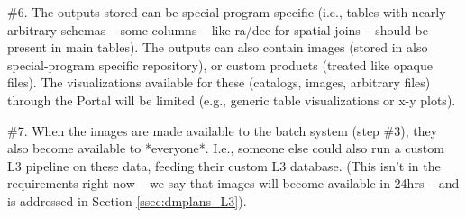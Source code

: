 \documentclass[DM,lsstdraft,toc]{lsstdoc}
\begin{document}
\#6. The outputs stored can be special-program specific (i.e., tables with nearly arbitrary schemas -- some columns -- like ra/dec for spatial joins -- should be present in main tables). The outputs can also contain images (stored in also special-program specific repository), or custom products (treated like opaque files). The visualizations available for these (catalogs, images, arbitrary files) through the Portal will be limited (e.g., generic table visualizations or x-y plots).

\#7. When the images are made available to the batch system (step \#3), they also become available to *everyone*. I.e., someone else could also run a custom L3 pipeline on these data, feeding their custom L3 database. (This isn't in the requirements right now -- we say that images will become available in 24hrs -- and is addressed in Section \ref{ssec:dmplans_L3}).

\clearpage

\end{document}
